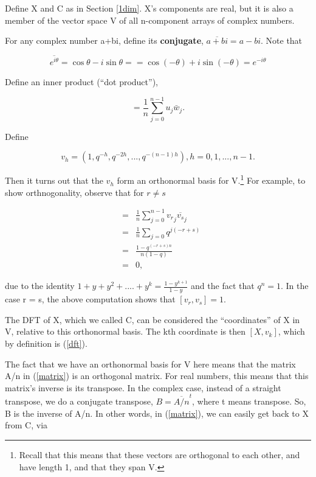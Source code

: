 Define X and C as in Section \ref{1dim}.  X's components are real, but
it is also a member of the vector space V of all n-component arrays of
complex numbers.  

For any complex number a+bi, define its {\bf conjugate},
$\overline{a+bi} = a-bi$.  Note that

\begin{equation}
\overline{e^{i \theta}} = \cos \theta - i \sin \theta = 
= \cos (-\theta) + i \sin (-\theta) =
e^{-i \theta} 
\end{equation}

Define an inner product (``dot product''),

\begin{equation}
[u,w] = \frac{1}{n} \sum_{j=0}^{n-1} u_j \bar{w}_j.
\end{equation}

Define

\begin{equation}
v_h = (1,q^{-h},q^{-2h}, ..., q^{-(n-1)h}), h = 0,1,...,n-1.
\end{equation}

Then it turns out that the $v_h$ form an orthonormal basis for
V.\footnote{Recall that this means that these vectors are orthogonal to
each other, and have length 1, and that they span V.} For example, to
show orthnogonality, observe that for $r \neq s$

\begin{eqnarray}
[v_r,v_s] &=& \frac{1}{n} \sum_{j=0}^{n-1} {v_r}_j \overline{v_s}_j \\
&=& \frac{1}{n} \sum_{j=0} q^{j(-r+s)} \\
&=& \frac{1-q^{(-r+s)n}}{n(1-q)} \\
&=& 0,
\end{eqnarray}

due to the identity  $1+y+y^2+....+y^k = \frac{1-y^{k+1}}{1-y}$ and the
fact that $q^n = 1$.  In the case r = s, the above computation shows
that $[v_r,v_s] = 1$.

The DFT of X, which we called C, can be considered the ``coordinates''
of X in V, relative to this orthonormal basis.  The kth coordinate is
then $[X,v_k]$, which by definition is (\ref{dft}).

The fact that we have an orthonormal basis for V here means that the
matrix A/n in (\ref{matrix}) is an orthogonal matrix.  For real numbers,
this means that this matrix's inverse is its transpose.  In the complex
case, instead of a straight transpose, we do a conjugate transpose,
$B = \overline{A/n}^t$, where t means transpose.  So, B is the inverse of
A/n.  In other words, in (\ref{matrix}), we can easily get back to X
from C, via

